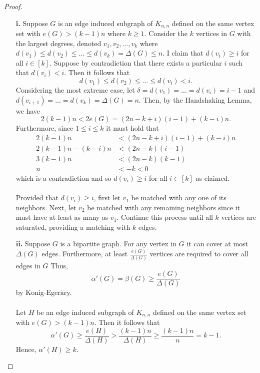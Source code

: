 \documentclass[ 12pt ]{article}
\begin{document}
\begin{enumerate}
		\begin{proof}
			\begin{enumerate}
				\item[\textbf{i.}] Suppose $G$ is an edge induced subgraph of $K_{n, n}$ defined on the same vertex set with $e(G) > (k-1)n$ where $k \geq 1$. Consider the $k$ vertices
					in $G$ with the largest degrees, denoted $v_1, v_2, \hdots, v_k$ where $d(v_1) \leq d(v_2) \leq \hdots \leq d(v_k) = \Delta(G) \leq n$. I claim that $d(v_i) \geq i$
					for all $i \in [k]$. Suppose by contradiction that there exists a particular $i$ such that $d(v_i) < i$. Then it follows that $$d(v_1) \leq d(v_2) \leq \hdots \leq
					d(v_i) < i.$$ Considering the most extreme case, let $\delta = d(v_1) = \hdots = d(v_i) = i - 1$ and $d(v_{i+1}) = \hdots = d(v_k) = \Delta(G) = n$. Then, by the
					Handshaking Lemma, we have $$2(k-1)n < 2e(G) = (2n - k + i)(i - 1) + (k - i)n.$$ Furthermore, since $1 \leq i \leq k$ it must hold that
					\begin{align*}
						2(k - 1)n &< (2n - k + i)(i - 1) + (k - i)n \\
						2(k - 1)n - (k - i)n &< (2n - k)(i - 1) \\
						3(k - 1)n &< (2n - k)(k - 1) \\
						n &< -k < 0
					\end{align*}
					which is a contradiction and so $d(v_i) \geq i$ for all $i \in [k]$ as claimed. \\ \\
					Provided that $d(v_i) \geq i$, first let $v_1$ be matched with any one of its neighbors. Next, let $v_2$ be matched with any remaining neighbors since it must have
					at least as many as $v_1$. Continue this process until all $k$ vertices are saturated, providing a matching with $k$ edges.

				\item[\textbf{ii.}] Suppose $G$ is a bipartite graph. For any vertex in $G$ it can cover at most $\Delta(G)$ edges. Furthermore, at least $\frac{e(G)}{\Delta(G)}$
					vertices are required to cover all edges in $G$ Thus, $$\alpha'(G) = \beta(G) \geq \frac{e(G)}{\Delta(G)}$$ by K$\ddot{\mathrm{o}}$nig-Eger$\acute{\mathrm{a}}$ry. \\
					\\
					Let $H$ be an edge induced subgraph of $K_{n, n}$ defined on the same vertex set with $e(G) > (k-1)n$. Then it follows that $$\alpha'(G) \geq \frac{e(H)}{\Delta(H)}
					> \frac{(k-1)n}{\Delta(H)} \geq \frac{(k-1)n}{n} = k - 1.$$ Hence, $\alpha'(H) \geq k$.


\end{enumerate}
\end{proof}
\end{enumerate}
\end{document}
